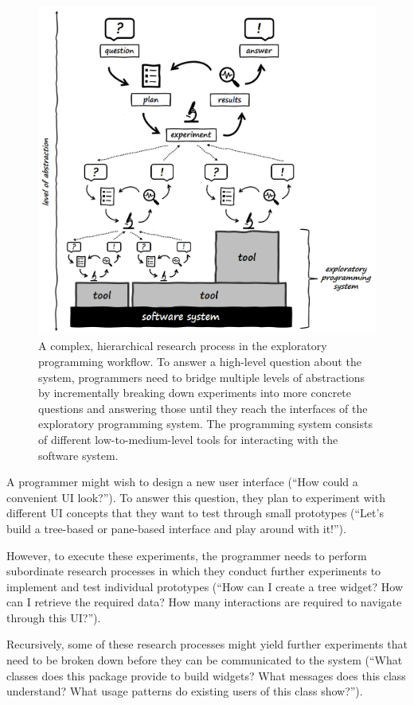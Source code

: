 \begin{figure}
	\centering
	\includegraphics[width=\textwidth]{01_exp/complex_process.png}
	\caption[A \emph{hierarchical research process} in the exploratory programming workflow.]{
		A complex, hierarchical research process in the exploratory programming workflow.
		To answer a high-level question about the system, programmers need to bridge multiple levels of abstractions by incrementally breaking down experiments into more concrete questions and answering those until they reach the interfaces of the exploratory programming system.
		The programming system consists of different low-to-medium-level tools for interacting with the software system.
	}
	\label{fig:background/exp/complex_process}
\end{figure}

\begin{example}
	A programmer might wish to design a new user interface (``How could a convenient UI look?'').
	To answer this question, they plan to experiment with different UI concepts that they want to test through small prototypes (``Let's build a tree-based or pane-based interface and play around with it!'').

	However, to execute these experiments, the programmer needs to perform subordinate research processes in which they conduct further experiments to implement and test individual prototypes (``How can I create a tree widget? How can I retrieve the required data? How many interactions are required to navigate through this UI?'').

	Recursively, some of these research processes might yield further experiments that need to be broken down before they can be communicated to the system (``What classes does this package provide to build widgets? What messages does this class understand? What usage patterns do existing users of this class show?'').
\end{example}
